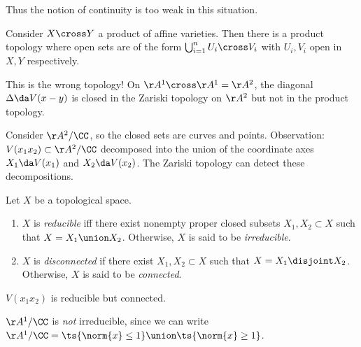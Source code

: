 Thus the notion of continuity is too weak in this situation.

\begin{example}

Consider \(X\cross Y\) a product of affine varieties. Then there is a
product topology where open sets are of the form
\(\bigcup_{i=1}^n U_i \cross V_i\) with \(U_i, V_i\) open in \(X, Y\)
respectively.

This is the wrong topology! On \(\AA^1 \cross \AA^1 = \AA^2\), the
diagonal \(\Delta \da V(x-y)\) is closed in the Zariski topology on
\(\AA^2\) but not in the product topology.

\end{example}

\begin{example}

Consider \(\AA^2/\CC\), so the closed sets are curves and points.
Observation: \(V(x_1 x_2 ) \subset \AA^2/\CC\) decomposed into the union
of the coordinate axes \(X_1 \da V(x_1)\) and \(X_2 \da V(x_2)\). The
Zariski topology can detect these decompositions.

\end{example}

\begin{definition}

Let \(X\) be a topological space.

\begin{enumerate}
\def\labelenumi{\alph{enumi}.}
\item
  \(X\) is \emph{reducible} iff there exist nonempty proper closed
  subsets \(X_1 ,X_2 \subset X\) such that \(X = X_1 \union X_2\).
  Otherwise, \(X\) is said to be \emph{irreducible}.
\item
  \(X\) is \emph{disconnected} if there exist \(X_1, X_2 \subset X\)
  such that \(X = X_1 \disjoint X_2\). Otherwise, \(X\) is said to be
  \emph{connected}.
\end{enumerate}

\end{definition}

\begin{example}

\(V(x_1 x_2)\) is reducible but connected.

\end{example}

\begin{remark}

\(\AA^1/\CC\) is \emph{not} irreducible, since we can write
\(\AA^1/\CC = \ts{\norm{x} \leq 1} \union \ts{\norm{x} \geq 1}\).

\end{remark}


